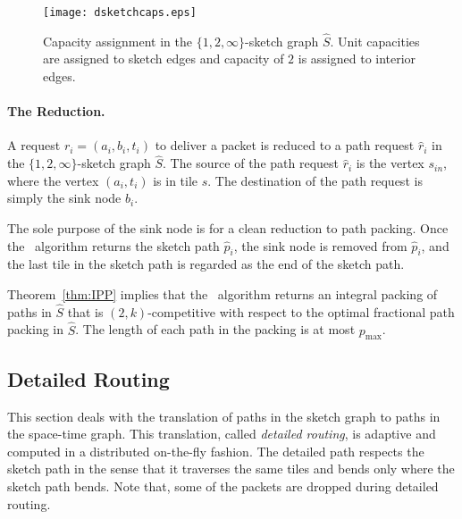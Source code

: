 \documentclass[11pt]{article}
\newcommand{\route}{\text{\sc{ipp}}}
\newcommand{\IPP}{\route}
\newcommand{\pmax}{p_{\max}}
\newenvironment{proof sketch}[1]{\noindent {\emph{Proof sketch of #1:}}}{\hfill \qed}
\begin{document}
\begin{figure}[h]
  \centering
\texttt{[image: dsketchcaps.eps]}
\caption{
Capacity assignment in the $\{1,2,\infty\}$-sketch graph $\hat S$. Unit capacities are assigned to sketch edges and capacity of $2$ is assigned to interior edges.}
\label{fig:dsketchcaps}
\end{figure}

\paragraph{The Reduction.}
A request $r_i=(a_i,b_i,t_i)$ to deliver a packet is reduced to a path request $\hat r_i$ in the $\{1,2,\infty\}$-sketch graph $\hat S$. The source of the path request $\hat r_i$ is the vertex  $s_{in}$, where the vertex $(a_i,t_i)$ is in tile $s$. The destination of the path request is simply the sink node $\hat b_i$.


The sole purpose of the sink node is for a clean reduction to path packing. Once the \IPP\ algorithm returns the sketch path $\hat p_i$, the sink node is removed from $\hat p_i$, and the last tile in the sketch path is regarded as the end of the sketch path.

\begin{comment}
A reduction of (fractional) packet routing to (fractional) packing of
paths was presented in~\cite{AZ}.  In this reduction, a packet request
$r_i=(a_i,b_i,t_i)$ is reduced to a connection request $r_i^{st}
\triangleq ((a_i,t_i), \hat b_i)$ in the space-time graph $G^{st}$,
where $\hat b_i$ is the sink node associated with $b_i$.
This reduction preserves the (fractional) throughput.
\end{comment}

Theorem~\ref{thm:IPP} implies that the \IPP\ algorithm returns an integral packing of paths in $\hat S$ that is
$(2,k)$-competitive with respect to the optimal fractional path packing in $\hat S$. The length of each path in the packing is at most $\pmax$.

\subsection{Detailed Routing}\label{sec:detailed}
This section deals with the translation of paths in the sketch graph to paths in the space-time graph. This translation, called \emph{detailed routing}, is adaptive and computed in a distributed on-the-fly fashion.
The detailed path respects the sketch path in the sense that it traverses the same tiles and bends only where the sketch path bends.
Note that, some of the packets are dropped during detailed routing.
\end{document}
